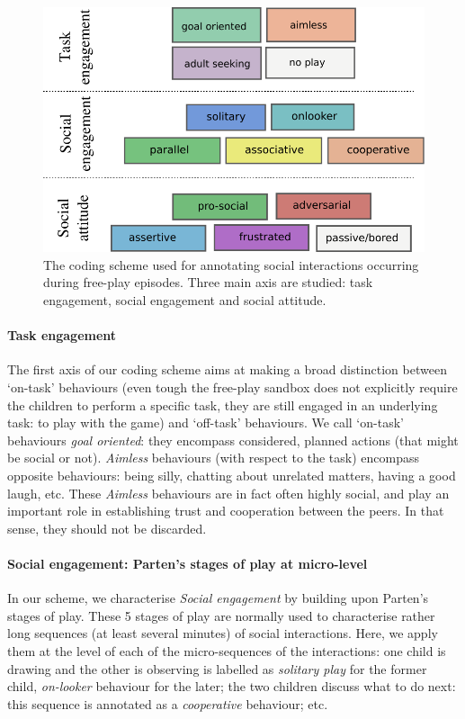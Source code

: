 \documentclass[sigconf]{acmart}
\begin{document}
\begin{figure}
    \centering
    \includegraphics[width=\columnwidth]{coding-scheme}
    \caption{The coding scheme used for annotating social interactions occurring
    during free-play episodes. Three main axis are studied: task engagement,
    social engagement and social attitude.}
    \label{fig|coding-scheme}
\end{figure}

\paragraph{Task engagement}

The first axis of our coding scheme aims at making a broad distinction between
`on-task' behaviours (even tough the free-play sandbox does not explicitly
require the children to perform a specific task, they are still engaged in an
underlying task: to play with the game) and `off-task' behaviours. We call
`on-task' behaviours \emph{goal oriented}: they encompass considered, planned
actions (that might be social or not). \emph{Aimless} behaviours (with respect
to the task) encompass opposite behaviours: being silly, chatting about
unrelated matters, having a good laugh, etc. These \emph{Aimless} behaviours are
in fact often highly social, and play an important role in establishing trust
and cooperation between the peers. In that sense, they should not be discarded.

\paragraph{Social engagement: Parten's stages of play at micro-level}

In our scheme, we characterise \emph{Social engagement} by building upon
Parten's stages of play. These 5 stages of play are normally
used to characterise rather long sequences (at least several minutes) of social
interactions. Here, we apply them at the level of each of the micro-sequences of
the interactions: one child is drawing and the other is observing is labelled as
\emph{solitary play} for the former child, \emph{on-looker} behaviour for the
later; the two children discuss what to do next: this sequence is annotated as
a \emph{cooperative} behaviour; etc.
\end{document}
